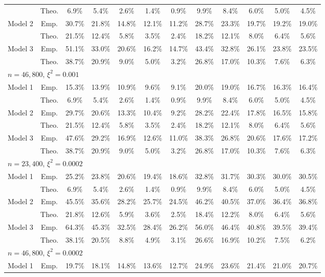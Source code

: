 \documentclass[11pt]{article}
\numberwithin{equation}{section}
\theoremstyle{plain}
\theoremstyle{remark}
\begin{document}
\begin{table}
{\begin{tabular}{@{}rccccccccccc@{}}
  &Theo. & 6.9\%&5.4\%&2.6\%&1.4\%&0.9\%&9.9\%&8.4\%&6.0\%&5.0\%&4.5\%\\
\multirow{2}{*}{Model 2} & Emp. &30.7\%&21.8\%&14.8\%&12.1\%&11.2\%&28.7\%&23.3\%&19.7\%&19.2\%&19.0\%\\
  &Theo. &21.5\%&12.4\%&5.8\%&3.5\%&2.4\%&18.2\%&12.1\%&8.0\%&6.4\%&5.6\%\\
\multirow{2}{*}{Model 3} & Emp. & 51.1\%&33.0\%&20.6\%&16.2\%&14.7\%&43.4\%&32.8\%&26.1\%&23.8\%&23.5\%\\
  &Theo. & 38.7\%&20.9\%&9.0\%&5.0\%&3.2\%&26.8\%&17.0\%&10.3\%&7.6\%&6.3\%\\
\multicolumn{12}{l}{$n = 46,800$, $\xi^2 = 0.001$}  \\                                               \multirow{2}{*}{Model 1} & Emp. & 15.3\%&13.9\%&10.9\%&9.6\%&9.1\%&20.0\%&19.0\%&16.7\%&16.3\%&16.4\%\\
  &Theo. & 6.9\%&5.4\%&2.6\%&1.4\%&0.9\%&9.9\%&8.4\%&6.0\%&5.0\%&4.5\%\\
\multirow{2}{*}{Model 2} & Emp. & 29.7\%&20.6\%&13.3\%&10.4\%&9.2\%&28.2\%&22.4\%&17.8\%&16.5\%&15.8\%\\
  &Theo. & 21.5\%&12.4\%&5.8\%&3.5\%&2.4\%&18.2\%&12.1\%&8.0\%&6.4\%&5.6\%\\
\multirow{2}{*}{Model 3} & Emp. & 47.6\%&29.2\%&16.9\%&12.6\%&11.0\%&38.3\%&26.8\%&20.6\%&17.6\%&17.2\%\\
  &Theo. & 38.7\%&20.9\%&9.0\%&5.0\%&3.2\%&26.8\%&17.0\%&10.3\%&7.6\%&6.3\%\\
\multicolumn{12}{l}{$n = 23,400$, $\xi^2 = 0.0002$}                                                                                                                         \\
\multirow{2}{*}{Model 1} & Emp. & 25.2\%&23.8\%&20.6\%&19.4\%&18.6\%&32.8\%&31.7\%&30.3\%&30.0\%&30.5\%\\
  &Theo. & 6.9\%&5.4\%&2.6\%&1.4\%&0.9\%&9.9\%&8.4\%&6.0\%&5.0\%&4.5\%\\
\multirow{2}{*}{Model 2} & Emp. &45.5\%&35.6\%&28.2\%&25.7\%&24.5\%&46.2\%&40.5\%&37.0\%&36.4\%&36.8\%\\
  &Theo. &21.8\%&12.6\%&5.9\%&3.6\%&2.5\%&18.4\%&12.2\%&8.0\%&6.4\%&5.6\%\\
\multirow{2}{*}{Model 3} & Emp. &64.3\%&45.3\%&32.5\%&28.4\%&26.2\%&56.0\%&46.4\%&40.8\%&39.5\%&39.4\%\\
  &Theo. &38.1\%&20.5\%&8.8\%&4.9\%&3.1\%&26.6\%&16.9\%&10.2\%&7.5\%&6.2\%\\
\multicolumn{12}{l}{$n = 46,800$, $\xi^2 = 0.0002$}  \\                                               \multirow{2}{*}{Model 1} & Emp. &19.7\%&18.1\%&14.8\%&13.6\%&12.7\%&24.9\%&23.6\%&21.4\%&21.0\%&20.7\%\\

\end{tabular}}
\end{table}
\end{document}
